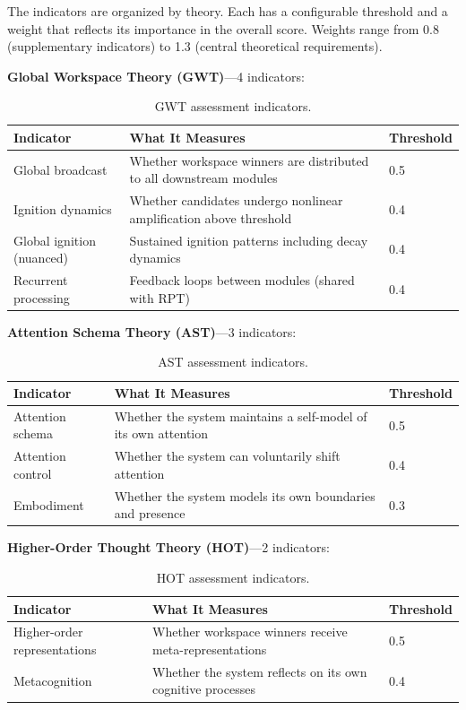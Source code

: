 The indicators are organized by theory. Each has a configurable threshold and a weight that reflects its importance in the overall score. Weights range from 0.8 (supplementary indicators) to 1.3 (central theoretical requirements).

\textbf{Global Workspace Theory (GWT)}---4 indicators:

\begin{table}[t]
\centering
\begin{tabular}{p{3.5cm}p{7.5cm}l}
\toprule
\textbf{Indicator} & \textbf{What It Measures} & \textbf{Threshold} \\
\midrule
Global broadcast & Whether workspace winners are distributed to all downstream modules & 0.5 \\
Ignition dynamics & Whether candidates undergo nonlinear amplification above threshold & 0.4 \\
Global ignition (nuanced) & Sustained ignition patterns including decay dynamics & 0.4 \\
Recurrent processing & Feedback loops between modules (shared with RPT) & 0.4 \\
\bottomrule
\end{tabular}
\caption{GWT assessment indicators.}
\label{tab:indicators-gwt}
\end{table}

\textbf{Attention Schema Theory (AST)}---3 indicators:

\begin{table}[t]
\centering
\begin{tabular}{p{3.5cm}p{7.5cm}l}
\toprule
\textbf{Indicator} & \textbf{What It Measures} & \textbf{Threshold} \\
\midrule
Attention schema & Whether the system maintains a self-model of its own attention & 0.5 \\
Attention control & Whether the system can voluntarily shift attention & 0.4 \\
Embodiment & Whether the system models its own boundaries and presence & 0.3 \\
\bottomrule
\end{tabular}
\caption{AST assessment indicators.}
\label{tab:indicators-ast}
\end{table}

\textbf{Higher-Order Thought Theory (HOT)}---2 indicators:

\begin{table}[t]
\centering
\begin{tabular}{p{3.5cm}p{7.5cm}l}
\toprule
\textbf{Indicator} & \textbf{What It Measures} & \textbf{Threshold} \\
\midrule
Higher-order representations & Whether workspace winners receive meta-representations & 0.5 \\
Metacognition & Whether the system reflects on its own cognitive processes & 0.4 \\
\bottomrule
\end{tabular}
\caption{HOT assessment indicators.}
\label{tab:indicators-hot}
\end{table}

